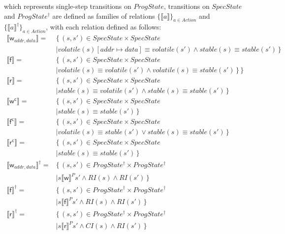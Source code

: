 \documentclass[letterpaper,twocolumn,10pt]{article}
\theoremstyle{definition}
\begin{document}
which represents single-step transitions on $\mathit{ProgState}$,
transitions on $\mathit{SpecState}$ and $\mathit{ProgState^\dagger}$ are defined as families of relations $\{ \llbracket a \rrbracket \}_\mathit{a \in Action}$ and $\{ \llbracket a \rrbracket^\dagger \}_\mathit{a \in Action}$, with each relation defined as follows:
\begin{align*}
	\llbracket \mathsf w_{addr, data} \rrbracket ={}& \{\, (s, s') \in SpecState \times SpecState\\ &\mid \mathit{volatile(s)[addr \mapsto data]} \equiv \mathit{volatile(s')}
	\land stable(s) \equiv stable(s') \,\} \\
	\llbracket \mathsf f \rrbracket ={}& \{\, (s, s') \in SpecState \times SpecState\\ & \mid \mathit{volatile(s)} \equiv \mathit{volatile(s')} \land \mathit{volatile(s)} \equiv \mathit{stable(s')}\,\} \,\} \\
	\llbracket \mathsf r \rrbracket ={}& \{\, (s, s') \in SpecState \times SpecState\\ & \mid\mathit{stable(s)} \equiv \mathit{volatile(s')} \land \mathit{stable(s)} \equiv \mathit{stable(s')} \,\} \\
	\llbracket \mathsf {w^c} \rrbracket ={}& \{\, (s, s') \in SpecState \times SpecState\\ & \mid\mathit{stable(s)} \equiv \mathit{stable(s')} \,\} \\
	\llbracket \mathsf {f^c} \rrbracket ={}& \{\, (s, s') \in SpecState \times SpecState\\ & \mid\mathit{volatile(s)} \equiv \mathit{stable(s')} \lor \mathit{stable(s)} \equiv \mathit{stable(s')} \,\} \\
	\llbracket \mathsf {r^c} \rrbracket ={}& \{\, (s, s') \in SpecState \times SpecState\\ & \mid\mathit{stable(s)} \equiv \mathit{stable(s')} \,\} \\
	\llbracket \mathsf w_{addr, data} \rrbracket^\dagger ={}& \{\, (s, s') \in ProgState^\dagger \times ProgState^\dagger\\ &\mid s \llbracket \mathsf w \rrbracket^P s' \land \mathit{RI(s)} \land \mathit{RI(s')} \,\} \\
	\llbracket \mathsf f \rrbracket^\dagger ={}& \{\, (s, s') \in ProgState^\dagger \times ProgState^\dagger\\ &\mid s \llbracket \mathsf f \rrbracket^P s' \land \mathit{RI(s)} \land \mathit{RI(s')} \,\} \\
	\llbracket \mathsf r \rrbracket^\dagger ={}& \{\, (s, s') \in ProgState^\dagger \times ProgState^\dagger\\ &\mid s \llbracket \mathsf r \rrbracket^P s' \land \mathit{CI(s)} \land \mathit{RI(s')} \,\} \\

\end{align*}
\end{document}
